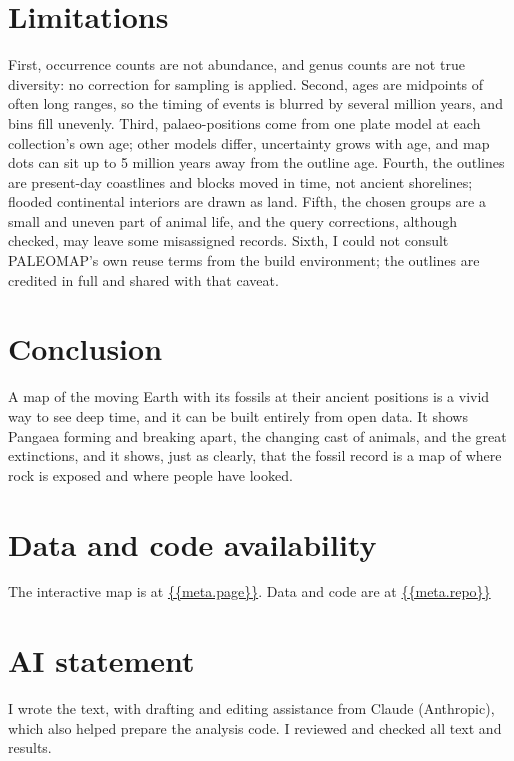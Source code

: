 \documentclass[11pt,a4paper]{article}
\begin{document}
\section{Limitations}
First, occurrence counts are not abundance, and genus counts are not true diversity: no correction for sampling is applied. Second, ages are midpoints of often long ranges, so the timing of events is blurred by several million years, and bins fill unevenly. Third, palaeo-positions come from one plate model at each collection's own age; other models differ, uncertainty grows with age, and map dots can sit up to 5 million years away from the outline age. Fourth, the outlines are present-day coastlines and blocks moved in time, not ancient shorelines; flooded continental interiors are drawn as land. Fifth, the chosen groups are a small and uneven part of animal life, and the query corrections, although checked, may leave some misassigned records. Sixth, I could not consult PALEOMAP's own reuse terms from the build environment; the outlines are credited in full and shared with that caveat.

\section{Conclusion}
A map of the moving Earth with its fossils at their ancient positions is a vivid way to see deep time, and it can be built entirely from open data. It shows Pangaea forming and breaking apart, the changing cast of animals, and the great extinctions, and it shows, just as clearly, that the fossil record is a map of where rock is exposed and where people have looked.

\section*{Data and code availability}
The interactive map is at \url{{{meta.page}}}. Data and code are at \url{{{meta.repo}}}%

\section*{AI statement}
I wrote the text, with drafting and editing assistance from Claude (Anthropic), which also helped prepare the analysis code. I reviewed and checked all text and results.
\end{document}
